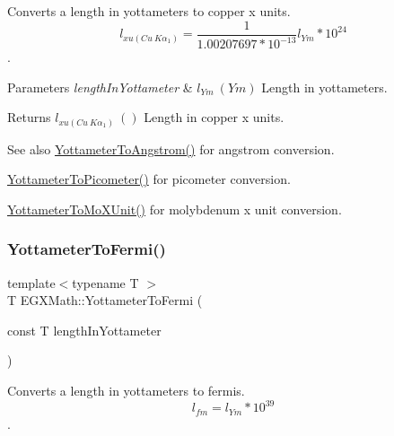 Converts a length in yottameters to copper x units. \[ l_{xu(Cu\ K\alpha_1)}= \frac{1}{1.00207697*10^{-13}} l_{Ym} * 10^{24}\]. 


\begin{DoxyParams}{Parameters}
{\em length\+In\+Yottameter} & $ l_{Ym}\ (Ym)$ Length in yottameters. \\
\hline
\end{DoxyParams}
\begin{DoxyReturn}{Returns}
$ l_{xu(Cu\ K\alpha_1)}\ ()$ Length in copper x units. 
\end{DoxyReturn}
\begin{DoxySeeAlso}{See also}
\mbox{\hyperlink{group___e_g_x_math-_conversions-_length_conversions-_s_i-_yottameter-_non-_s_i_ga0129b788ceb2d7d4ce86c155ee9d4675}{Yottameter\+To\+Angstrom()}} for angstrom conversion. 

\mbox{\hyperlink{group___e_g_x_math-_conversions-_length_conversions-_s_i-_yottameter-_s_i_ga7af9d1314de06921546f079641c033b2}{Yottameter\+To\+Picometer()}} for picometer conversion. 

\mbox{\hyperlink{group___e_g_x_math-_conversions-_length_conversions-_s_i-_yottameter-_non-_s_i_ga545da9526f7a62f5ca7d1800faf17d1d}{Yottameter\+To\+Mo\+X\+Unit()}} for molybdenum x unit conversion. 
\end{DoxySeeAlso}
\mbox{\label{group___e_g_x_math-_conversions-_length_conversions-_s_i-_yottameter-_non-_s_i_gabf900c05975691fab8c5df7de16a467c}} 
\subsubsection{\texorpdfstring{Yottameter\+To\+Fermi()}{YottameterToFermi()}}
{\footnotesize\ttfamily template$<$typename T $>$ \\
T E\+G\+X\+Math\+::\+Yottameter\+To\+Fermi (\begin{DoxyParamCaption}\item[{const T}]{length\+In\+Yottameter }\end{DoxyParamCaption})}



Converts a length in yottameters to fermis. \[ l_{fm}=l_{Ym} * 10^{39} \]. 


